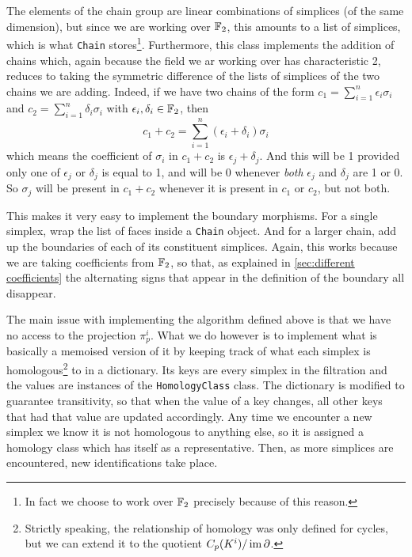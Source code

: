 \documentclass[../main.tex]{subfiles}
\begin{document}
The elements of the chain group are linear combinations of simplices (of the same
dimension), but since we are working over \( \mathbb{F}_2 \), this amounts to a list of simplices,
which is what \texttt{Chain} stores\footnote{In fact we choose to work over \( \mathbb{F}_2 \)
precisely because of this reason.}. Furthermore, this class implements the addition of
chains which, again because the field we ar working over has characteristic 2, reduces to
taking the symmetric difference of the lists of simplices of the two chains we are adding.
Indeed, if we have two chains of the form \( c_1 = \sum_{i = 1}^{n} \epsilon_i \sigma_i \)
and \( c_2 = \sum_{i = 1}^{n} \delta_i \sigma_i \) with \( \epsilon_i, \delta_i \in \mathbb{F}_2
\), then
\begin{equation*}
	c_1 + c_2 = \sum_{i = 1}^{n} (\epsilon_i + \delta_i) \sigma_i
\end{equation*}
which means the coefficient of \( \sigma_i \) in \( c_1 + c_2 \) is \( \epsilon_j +
\delta_j \). And this will be 1 provided only one of \( \epsilon_j \) or \( \delta_j \) is
equal to 1, and will be 0 whenever \emph{both} \( \epsilon_j \) and \( \delta_j \) are 1
or 0. So \( \sigma_j \) will be present in \( c_1 + c_2 \) whenever it is present in \(
c_1 \) or \( c_2 \), but not both. 

This makes it very easy to implement the boundary morphisms. For a single simplex, wrap
the list of faces inside a \texttt{Chain} object. And for a larger chain, add up the
boundaries of each of its constituent simplices. Again, this works because we are taking
coefficients from \( \mathbb{F}_2 \), so that, as explained in \cref{sec:different coefficients}
the alternating signs that appear in the definition of the boundary all disappear. 

The main issue with implementing the algorithm defined above is that we have no access to
the projection \( \pi_p^i \). What we do however is to implement what is basically a
memoised version of it by keeping track of what each simplex is
homologous\footnote{Strictly speaking, the relationship of homology was only defined for
cycles, but we can extend it to the quotient \( C_p(K^i)/\operatorname{im}{\partial} \).} to in a
dictionary. Its keys are every simplex in the filtration and the values are instances of
the \texttt{HomologyClass} class. The dictionary is modified to guarantee transitivity, so
that when the value of a key changes, all other keys that had that value are updated
accordingly. Any time we encounter a new simplex we know it is not homologous to anything
else, so it is assigned a homology class which has itself as a representative. Then, as
more simplices are encountered, new identifications take place. 
\end{document}
